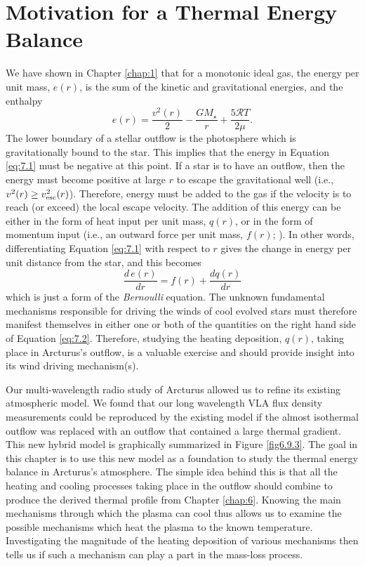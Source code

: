 \section{Motivation for a Thermal Energy Balance}\label{sec:7.1}
We have shown in Chapter \ref{chap:1} that for a monotonic ideal gas, the energy per unit mass, $e(r)$, is the sum of the kinetic and gravitational energies, and the enthalpy
\begin{equation}
\label{eq:7.1}
e(r)=\frac{v^2(r)}{2}-\frac{GM_{\star}}{r}+\frac{5\mathcal{R}T}{2\mu}.
\end{equation}
The lower boundary of a stellar outflow is the photosphere which is gravitationally bound to the star. This implies that the energy in Equation \ref{eq:7.1} must be negative at this point. If a star is to have an outflow, then the energy must become positive at large $r$ to escape the gravitational well (i.e., $v^2(r) \geq v_{\rm{esc}}^2(r)$). Therefore, energy must be added to the gas if the velocity is to reach (or exceed) the local escape velocity. The addition of this energy can be either in the form of heat input per unit mass, $q(r)$, or in the form of momentum input (i.e., an outward force per unit mass, $f(r)$; \cite{lamers_1999}). In other words, differentiating Equation \ref{eq:7.1} with respect to $r$ gives the change in energy per unit distance from the star, and this becomes
\begin{equation}
\label{eq:7.2}
\frac{d\,e(r)}{dr}=f(r)+\frac{dq(r)}{dr}
\end{equation}
which is just a form of the \textit{Bernoulli} equation. The unknown fundamental mechanisms responsible for driving the winds of cool evolved stars must therefore manifest themselves in either one or both of the quantities on the right hand side of Equation \ref{eq:7.2}. Therefore, studying the heating deposition, $q(r)$, taking place in Arcturus's outflow, is a valuable exercise and should provide insight into its wind driving mechanism(s).

Our multi-wavelength radio study of Arcturus allowed us to refine its existing atmospheric model. We found that our long wavelength VLA flux density measurements could be reproduced by the existing model if the almost isothermal outflow was replaced with an outflow that contained a large thermal gradient. This new hybrid model is graphically summarized in Figure \ref{fig6.9.3}. The goal in this chapter is to use this new model as a foundation to study the thermal energy balance in Arcturus's atmosphere. The simple idea behind this is that all the heating and cooling processes taking place in the outflow should combine to produce the derived thermal profile from Chapter \ref{chap:6}. Knowing the main mechanisms through which the plasma can cool thus allows us to examine the possible mechanisms which heat the plasma to the known temperature. Investigating the magnitude of the heating deposition of various mechanisms then tells us if such a mechanism can play a part in the mass-loss process.

